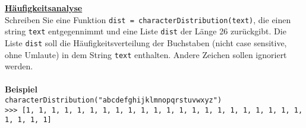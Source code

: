 \href{https://en.wikipedia.org/wiki/Frequency_analysis}{\textbf{Häufigkeitsanalyse}}\\
Schreiben Sie eine Funktion \verb|dist = characterDistribution(text)|, die einen string \verb|text| entgegennimmt und eine Liste \verb|dist| der Länge 26 zurückgibt. Die Liste \verb|dist| soll die Häufigkeitsverteilung der Buchstaben (nicht case sensitive, ohne Umlaute) in dem String \verb|text| enthalten. Andere Zeichen sollen ignoriert werden.\\~\\
\textbf{Beispiel}\\
\texttt{characterDistribution("abcdefghijklmnopqrstuvwxyz")}\\
\verb|>>> [1, 1, 1, 1, 1, 1, 1, 1, 1, 1, 1, 1, 1, 1, 1, 1, 1, 1, 1, 1, 1, 1, 1, 1, 1, 1]|\\
~\\